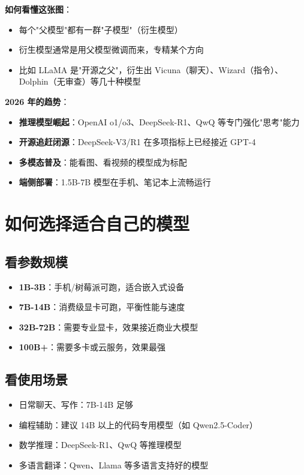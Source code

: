 \documentclass[12pt,UTF8]{ctexbook}
\begin{document}
\textbf{如何看懂这张图}：
\begin{itemize}
  \item 每个"父模型"都有一群"子模型"（衍生模型）
  \item 衍生模型通常是用父模型微调而来，专精某个方向
  \item 比如 LLaMA 是"开源之父"，衍生出 Vicuna（聊天）、Wizard（指令）、Dolphin（无审查）等几十种模型
\end{itemize}

\textbf{2026 年的趋势}：
\begin{itemize}
  \item \textbf{推理模型崛起}：OpenAI o1/o3、DeepSeek-R1、QwQ 等专门强化"思考"能力
  \item \textbf{开源追赶闭源}：DeepSeek-V3/R1 在多项指标上已经接近 GPT-4
  \item \textbf{多模态普及}：能看图、看视频的模型成为标配
  \item \textbf{端侧部署}：1.5B-7B 模型在手机、笔记本上流畅运行
\end{itemize}

\chapter{如何选择适合自己的模型}

\section{看参数规模}

\begin{itemize}
  \item \textbf{1B-3B}：手机/树莓派可跑，适合嵌入式设备
  \item \textbf{7B-14B}：消费级显卡可跑，平衡性能与速度
  \item \textbf{32B-72B}：需要专业显卡，效果接近商业大模型
  \item \textbf{100B+}：需要多卡或云服务，效果最强
\end{itemize}

\section{看使用场景}

\begin{itemize}
  \item 日常聊天、写作：7B-14B 足够
  \item 编程辅助：建议 14B 以上的代码专用模型（如 Qwen2.5-Coder）
  \item 数学推理：DeepSeek-R1、QwQ 等推理模型
  \item 多语言翻译：Qwen、Llama 等多语言支持好的模型
\end{itemize}
\end{document}
